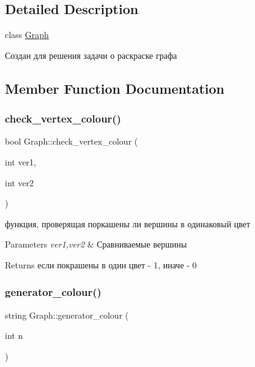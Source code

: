 \subsection{Detailed Description}
class \mbox{\hyperlink{class_graph}{Graph}} 

Создан для решения задачи о раскраске графа 

\subsection{Member Function Documentation}
\mbox{\label{class_graph_a6e7e592ff1b087e344eb37cdc8b65e00}} 
\subsubsection{\texorpdfstring{check\+\_\+vertex\+\_\+colour()}{check\_vertex\_colour()}}
{\footnotesize\ttfamily bool Graph\+::check\+\_\+vertex\+\_\+colour (\begin{DoxyParamCaption}\item[{int}]{ver1,  }\item[{int}]{ver2 }\end{DoxyParamCaption})}



функция, проверящая поркашены ли вершины в одинаковый цвет 


\begin{DoxyParams}{Parameters}
{\em ver1,ver2} & Сравниваемые вершины \\
\hline
\end{DoxyParams}
\begin{DoxyReturn}{Returns}
если покрашены в один цвет -\/ 1, иначе -\/ 0 
\end{DoxyReturn}
\mbox{\label{class_graph_aef156ae0e0d14b85f46eaa01d8348c0f}} 
\subsubsection{\texorpdfstring{generator\+\_\+colour()}{generator\_colour()}}
{\footnotesize\ttfamily string Graph\+::generator\+\_\+colour (\begin{DoxyParamCaption}\item[{int}]{n }\end{DoxyParamCaption})}



